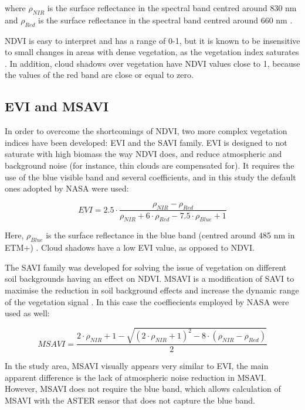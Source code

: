 \documentclass[a4paper,12pt]{scrbook}
\begin{document}
where $\rho_{NIR}$ is the surface reflectance in the spectral band centred around 830 nm and $\rho_{Red}$ is the surface reflectance in the spectral band centred around 660 nm \citep{tucker_monitoring_1979}.

\ac{NDVI} is easy to interpret and has a range of 0-1, but it is known to be insensitive to small changes in areas with dense vegetation, as the vegetation index saturates \citep{huete_modis_1999}. In addition, cloud shadows over vegetation have \ac{NDVI} values close to 1, because the values of the red band are close or equal to zero.

\subsection{EVI and MSAVI}

In order to overcome the shortcomings of \ac{NDVI}, two more complex vegetation indices have been developed: \ac{EVI} and the \ac{SAVI} family. \ac{EVI} is designed to not saturate with high biomass the way NDVI does, and reduce atmospheric and background noise (for instance, thin clouds are compensated for). It requires the use of the blue visible band and several coefficients, and in this study the default ones adopted by NASA were used:

$$ EVI = 2.5 \cdot \frac{\rho_{NIR} - \rho_{Red}}{\rho_{NIR}+6 \cdot \rho_{Red} - 7.5 \cdot \rho_{Blue} + 1} $$

Here, $\rho_{Blue}$ is the surface reflectance in the blue band (centred around 485 nm in \ac{ETM+}) \citep{huete_modis_1999}. Cloud shadows have a low EVI value, as opposed to NDVI.

The \ac{SAVI} family was developed for solving the issue of vegetation on different soil backgrounds having an effect on NDVI. \ac{MSAVI} is a modification of \ac{SAVI} to maximise the reduction in soil background effects and increase the dynamic range of the vegetation signal \citep{qi_modified_1994}. In this case the coeffiecients employed by NASA were used as well:

$$ MSAVI = \frac{2 \cdot \rho_{NIR} + 1 - \sqrt{(2 \cdot \rho_{NIR} + 1)^2 - 8 \cdot (\rho_{NIR} - \rho_{Red})}}{2} $$

In the study area, \ac{MSAVI} visually appears very similar to \ac{EVI}, the main apparent difference is the lack of atmospheric noise reduction in \ac{MSAVI}. However, \ac{MSAVI} does not require the blue band, which allows calculation of \ac{MSAVI} with the \ac{ASTER} sensor that does not capture the blue band.
\end{document}
